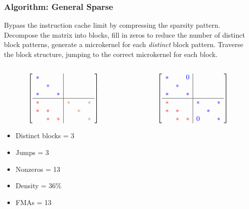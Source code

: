 \documentclass[9pt]{beamer}
\begin{document}
\begin{frame}[fragile]
  \frametitle{Algorithm: General Sparse}
  Bypass the instruction cache limit by compressing the sparsity pattern. Decompose the matrix into blocks, fill in zeros to reduce the number of distinct block patterns, generate a microkernel for each \emph{distinct} block pattern. Traverse the block structure, jumping to the correct microkernel for each block. 


\def\r{\color{red}}
\def\g{\color{brown}}
\def\b{\color{blue}}


  \begin{columns}[t]
    \begin{column}{0.3\textwidth}
      \[\left[
          \begin{array}{ccc|ccc}
          \b* &   &   &    &    &    \\
            & \b* &   &    &    &    \\
          \b* &   & \b* &    &    &    \\
          \hline
          \r* &   &   & \g* &   & \g*  \\
          \r* & \r* &   &   & \g* &    \\
            & \r* & \r* &   &   & \g*  \\
          \end{array}
          \right]\]
        \footnotesize
        \begin{itemize}
          \item Distinct blocks = 3
          \item Jumps = 3
          \item Nonzeros = 13
          \item Density = 36\%
          \item FMAs = 13
        \end{itemize}
    \end{column}
    \begin{column}{0.3\textwidth}
      \[
      \left[
          \begin{array}{ccc|ccc}
          \b* &   & \b0 &    &    &    \\
            & \b* &   &    &    &    \\
          \b* &   & \b* &    &    &    \\
          \hline
          \r* &   &   & \b* &   & \b*  \\
          \r* & \r* &   &   & \b* &    \\
            & \r* & \r* & \b0 &   & \b*  \\
          \end{array}
          \right] \]


\end{column}
\end{columns}
\end{frame}
\end{document}
